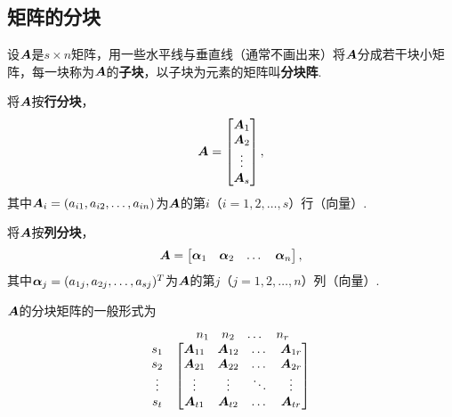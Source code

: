 \subsection{矩阵的分块}
\begin{definition}
设\(\boldsymbol{A}\)是\(s \times n\)矩阵，用一些水平线与垂直线（通常不画出来）将\(\boldsymbol{A}\)分成若干块小矩阵，每一块称为\(\boldsymbol{A}\)的\textbf{子块}，以子块为元素的矩阵叫\textbf{分块阵}.

将\(\boldsymbol{A}\)按\textbf{行分块}，\[
\boldsymbol{A}=\begin{bmatrix} \boldsymbol{A}_1 \\ \boldsymbol{A}_2 \\ \vdots \\ \boldsymbol{A}_s \end{bmatrix},
\]其中\(\boldsymbol{A}_i=(a_{i1},a_{i2},\dotsc,a_{in})\)为\(\boldsymbol{A}\)的第\(i\)（\(i=1,2,\dotsc,s\)）行（向量）.

将\(\boldsymbol{A}\)按\textbf{列分块}，\[
\boldsymbol{A}=\begin{bmatrix} \boldsymbol{\alpha}_1 & \boldsymbol{\alpha}_2 & \dots & \boldsymbol{\alpha}_n \end{bmatrix},
\]其中\(\boldsymbol{\alpha}_j=(a_{1j},a_{2j},\dotsc,a_{sj})^T\)为\(\boldsymbol{A}\)的第\(j\)（\(j=1,2,\dotsc,n\)）列（向量）.

\(\boldsymbol{A}\)的分块矩阵的一般形式为\[
\begin{matrix}
& \begin{matrix} n_1 & n_2 & \dots & n_r \end{matrix} \\
\begin{matrix} s_1 \\ s_2 \\ \vdots \\ s_t \end{matrix} & \begin{bmatrix}
\boldsymbol{A}_{11} & \boldsymbol{A}_{12} & \dots & \boldsymbol{A}_{1r} \\
\boldsymbol{A}_{21} & \boldsymbol{A}_{22} & \dots & \boldsymbol{A}_{2r} \\
\vdots & \vdots & \ddots & \vdots \\
\boldsymbol{A}_{t1} & \boldsymbol{A}_{t2} & \dots & \boldsymbol{A}_{tr}
\end{bmatrix}
\end{matrix}
\]
\end{definition}

